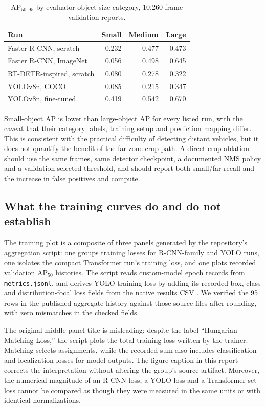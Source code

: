 \begin{table}[htbp]
\centering
\caption{AP$_{50:95}$ by evaluator object-size category, 10,260-frame validation reports.}
\label{tab:size-ap}
\begin{tabular}{lrrr}
\toprule
Run & Small & Medium & Large \\
\midrule
Faster R-CNN, scratch & 0.232 & 0.477 & 0.473 \\
Faster R-CNN, ImageNet & 0.056 & 0.498 & 0.645 \\
RT-DETR-inspired, scratch & 0.080 & 0.278 & 0.322 \\
YOLOv8n, COCO & 0.085 & 0.215 & 0.347 \\
YOLOv8n, fine-tuned & 0.419 & 0.542 & 0.670 \\
\bottomrule
\end{tabular}
\end{table}

Small-object AP is lower than large-object AP for every listed run, with the caveat that their category labels, training setup and prediction mapping differ. This is consistent with the practical difficulty of detecting distant vehicles, but it does not quantify the benefit of the far-zone crop path. A direct crop ablation should use the same frames, same detector checkpoint, a documented NMS policy and a validation-selected threshold, and should report both small/far recall and the increase in false positives and compute.

\subsection{What the training curves do and do not establish}
The training plot is a composite of three panels generated by the repository's aggregation script: one groups training losses for R-CNN-family and YOLO runs, one isolates the compact Transformer run's training loss, and one plots recorded validation AP$_{50}$ histories. The script reads custom-model epoch records from \texttt{metrics.jsonl}, and derives YOLO training loss by adding its recorded box, class and distribution-focal loss fields from the native results CSV \cite{plotcode}. We verified the 95 rows in the published aggregate history against those source files after rounding, with zero mismatches in the checked fields.

The original middle-panel title is misleading: despite the label ``Hungarian Matching Loss,'' the script plots the total training loss written by the trainer. Matching selects assignments, while the recorded sum also includes classification and localization losses for model outputs. The figure caption in this report corrects the interpretation without altering the group's source artifact. Moreover, the numerical magnitude of an R-CNN loss, a YOLO loss and a Transformer set loss cannot be compared as though they were measured in the same units or with identical normalizations.

